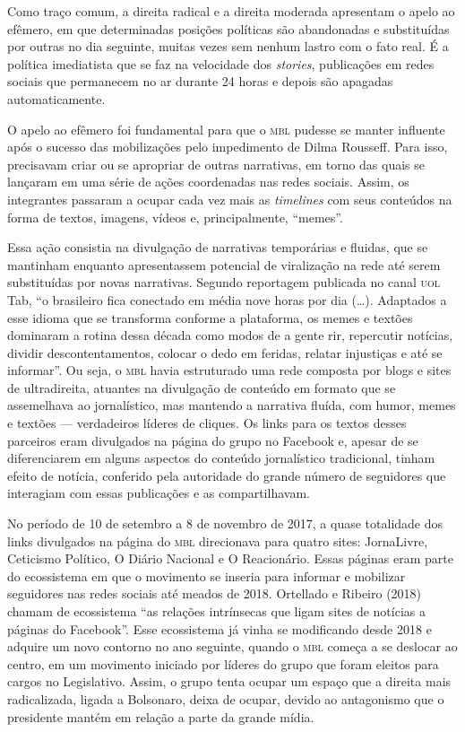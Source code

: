 Como traço comum, a direita radical e a direita moderada apresentam o
apelo ao efêmero, em que determinadas posições políticas são abandonadas
e substituídas por outras no dia seguinte, muitas vezes sem nenhum
lastro com o fato real. É a política imediatista que se faz na
velocidade dos \textit{stories}, publicações em redes sociais que
permanecem no ar durante 24 horas e depois são apagadas automaticamente.

O apelo ao efêmero foi fundamental para que o \textsc{mbl} pudesse se manter
influente após o sucesso das mobilizações pelo impedimento de Dilma
Rousseff. Para isso, precisavam criar ou se apropriar de outras
narrativas, em torno das quais se lançaram em uma série de ações
coordenadas nas redes sociais. Assim, os integrantes passaram a ocupar
cada vez mais as \textit{timelines} com seus conteúdos na forma de textos,
imagens, vídeos e, principalmente, ``memes''.


Essa ação consistia na divulgação de narrativas temporárias e fluidas,
que se mantinham enquanto apresentassem potencial de viralização na rede
até serem substituídas por novas narrativas. Segundo reportagem
publicada no canal \textsc{uol} Tab, ``o brasileiro fica conectado em média nove
horas por dia (\ldots{}). Adaptados a esse idioma que se transforma conforme
a plataforma, os memes e textões dominaram a rotina dessa década como
modos de a gente rir, repercutir notícias, dividir descontentamentos,
colocar o dedo em feridas, relatar injustiças e até se informar''. Ou
seja, o \textsc{mbl} havia estruturado uma rede composta por blogs e sites de
ultradireita, atuantes na divulgação de conteúdo em formato que se
assemelhava ao jornalístico, mas mantendo a narrativa fluída, com humor,
memes e textões --- verdadeiros líderes de cliques. Os links para os
textos desses parceiros eram divulgados na página do grupo no Facebook
e, apesar de se diferenciarem em alguns aspectos do conteúdo
jornalístico tradicional, tinham efeito de notícia, conferido pela
autoridade do grande número de seguidores que interagiam com essas
publicações e as compartilhavam.

No período de 10 de setembro a 8 de novembro de 2017, a quase totalidade
dos links divulgados na página do \textsc{mbl} direcionava para quatro sites:
JornaLivre, Ceticismo Político, O Diário Nacional e O Reacionário. Essas
páginas eram parte do ecossistema em que o movimento se inseria para
informar e mobilizar seguidores nas redes sociais até meados de 2018.
Ortellado e Ribeiro (2018) chamam de ecossistema ``as relações
intrínsecas que ligam sites de notícias a páginas do Facebook''. Esse
ecossistema já vinha se modificando desde 2018 e adquire um novo
contorno no ano seguinte, quando o \textsc{mbl} começa a se deslocar ao centro,
em um movimento iniciado por líderes do grupo que foram eleitos para
cargos no Legislativo. Assim, o grupo tenta ocupar um espaço que a
direita mais radicalizada, ligada a Bolsonaro, deixa de ocupar, devido
ao antagonismo que o presidente mantém em relação a parte da grande
mídia.

